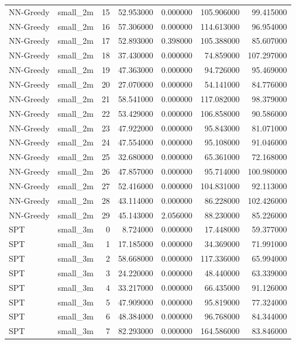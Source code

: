 \begin{tabular}{llrrrrr}
NN-Greedy & small_2m & 15 & 52.953000 & 0.000000 & 105.906000 & 99.415000 \\
NN-Greedy & small_2m & 16 & 57.306000 & 0.000000 & 114.613000 & 96.954000 \\
NN-Greedy & small_2m & 17 & 52.893000 & 0.398000 & 105.388000 & 85.607000 \\
NN-Greedy & small_2m & 18 & 37.430000 & 0.000000 & 74.859000 & 107.297000 \\
NN-Greedy & small_2m & 19 & 47.363000 & 0.000000 & 94.726000 & 95.469000 \\
NN-Greedy & small_2m & 20 & 27.070000 & 0.000000 & 54.141000 & 84.776000 \\
NN-Greedy & small_2m & 21 & 58.541000 & 0.000000 & 117.082000 & 98.379000 \\
NN-Greedy & small_2m & 22 & 53.429000 & 0.000000 & 106.858000 & 90.586000 \\
NN-Greedy & small_2m & 23 & 47.922000 & 0.000000 & 95.843000 & 81.071000 \\
NN-Greedy & small_2m & 24 & 47.554000 & 0.000000 & 95.108000 & 91.046000 \\
NN-Greedy & small_2m & 25 & 32.680000 & 0.000000 & 65.361000 & 72.168000 \\
NN-Greedy & small_2m & 26 & 47.857000 & 0.000000 & 95.714000 & 100.980000 \\
NN-Greedy & small_2m & 27 & 52.416000 & 0.000000 & 104.831000 & 92.113000 \\
NN-Greedy & small_2m & 28 & 43.114000 & 0.000000 & 86.228000 & 102.426000 \\
NN-Greedy & small_2m & 29 & 45.143000 & 2.056000 & 88.230000 & 85.226000 \\
SPT & small_3m & 0 & 8.724000 & 0.000000 & 17.448000 & 59.377000 \\
SPT & small_3m & 1 & 17.185000 & 0.000000 & 34.369000 & 71.991000 \\
SPT & small_3m & 2 & 58.668000 & 0.000000 & 117.336000 & 65.994000 \\
SPT & small_3m & 3 & 24.220000 & 0.000000 & 48.440000 & 63.339000 \\
SPT & small_3m & 4 & 33.217000 & 0.000000 & 66.435000 & 91.126000 \\
SPT & small_3m & 5 & 47.909000 & 0.000000 & 95.819000 & 77.324000 \\
SPT & small_3m & 6 & 48.384000 & 0.000000 & 96.768000 & 84.344000 \\
SPT & small_3m & 7 & 82.293000 & 0.000000 & 164.586000 & 83.846000 \\

\end{tabular}
